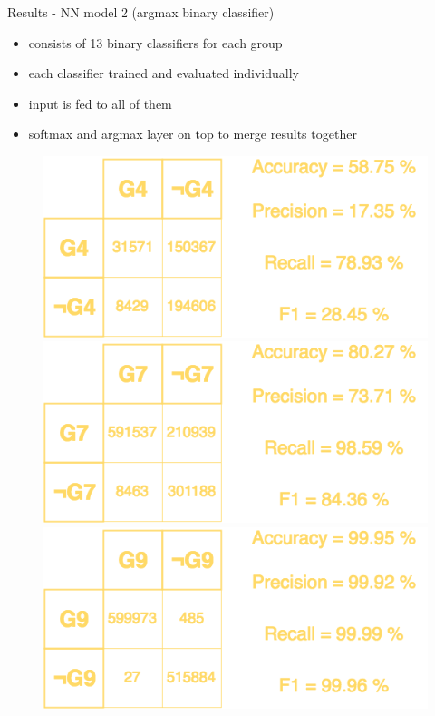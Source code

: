 \documentclass{beamer}
\begin{document}
\begin{darkframes}
    \begin{frame}{Results - NN model 2 (argmax binary classifier)}
      \begin{itemize}
        \item consists of 13 binary classifiers for each group
        \item each classifier trained and evaluated individually
        \item input is fed to all of them
        \item softmax and argmax layer on top to merge results together
      \end{itemize}
      \begin{figure}[H]
        \begin{minipage}{.33\textwidth}         
          \centering
          \includegraphics[width=0.95\linewidth]{../tex/images/results/rese_g4_512_img}
        \end{minipage}%
        \begin{minipage}{.33\textwidth}         
          \centering
          \includegraphics[width=0.95\linewidth]{../tex/images/results/rese_g7_512_img}
        \end{minipage}%
        \begin{minipage}{.33\textwidth}         
          \centering
          \includegraphics[width=0.95\linewidth]{../tex/images/results/rese_g9_512_img}

\end{minipage}
\end{figure}
\end{frame}
\end{darkframes}
\end{document}
